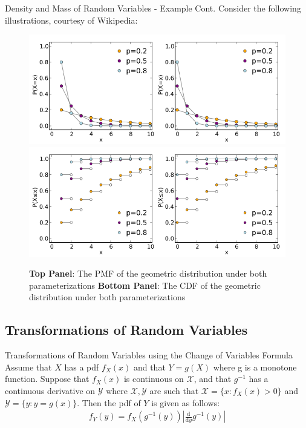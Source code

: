 \documentclass{beamer}
\begin{document}
\begin{frame}{Density and Mass of Random Variables - Example Cont.}
Consider the following illustrations, courtesy of Wikipedia:
\begin{center}
\begin{figure}
\includegraphics[scale = 0.25]{geometric_pmf}\\
\includegraphics[scale = 0.25]{geometric_cdf}
\caption{\textbf{Top Panel}: The PMF of the geometric distribution under both parameterizations \textbf{Bottom Panel}: The CDF of the geometric distribution under both parameterizations}
\end{figure}
\end{center}
\end{frame}

\subsection{Transformations of Random Variables}
\begin{frame}{Transformations of Random Variables using the Change of Variables Formula}
Assume that $X$ has a pdf $f_{X}(x)$ and that $Y = g(X)$ where g is a monotone function. Suppose that  $f_{X}(x)$ is continuous on $\mathcal{X}$, and that $g^{-1}$ has a continuous derivative on $\mathcal{Y}$ where $\mathcal{X}, \mathcal{Y}$ are such that $\mathcal{X} = \{x: f_{X}(x) > 0\}$ and $\mathcal{Y} = \{y: y = g(x)\}$. Then the pdf of $Y$ is given as follows:
\begin{align*}
f_{Y}(y) = f_{X}(g^{-1}(y))|\frac{\mathrm{d}}{\mathrm{d}y}g^{-1}(y)|
\end{align*}
\end{frame}
 
\end{document}
